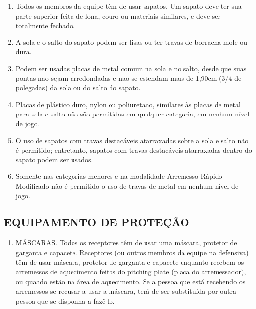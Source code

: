 \begin{multicols}{2}
	\begin{enumerate}[label=\alph*)]
		\item Todos os membros da equipe t\^em de usar sapatos. Um sapato deve ter sua parte 
		superior feita de lona, couro ou materiais similares, e deve ser totalmente fechado. 
		
		\item  A sola e o salto do sapato podem ser lisas ou ter travas de borracha mole ou dura. 
		
		\item  Podem ser usadas placas de metal comum na sola e no salto, desde que suas pontas 
		n\~ao sejam arredondadas e n\~ao se estendam mais de 1,90cm (3/4 de polegadas) da sola ou do salto do sapato. 
		
		\item  Placas de pl\'astico duro, nylon ou poliuretano, similares \`as placas de metal para sola 
		e salto n\~ao s\~ao permitidas em qualquer categoria, em nenhum n\'ivel de jogo. 
		
		\item  O uso de sapatos com travas destac\'aveis atarraxadas sobre a sola e salto n\~ao \'e 
		permitido; entretanto, sapatos com travas destac\'aveis atarraxadas dentro do sapato 
		podem ser usados. 
		
		\item  Somente nas categorias menores e na modalidade Arremesso R\'apido Modificado 
		n\~ao \'e permitido o uso de travas de metal em nenhum n\'ivel de jogo. 
	\end{enumerate}
	
	\subsection{EQUIPAMENTO DE PROTE\c{C}\~AO}\label{ssec:EquipProtecao} 
	
	\begin{enumerate}[label=\alph*)]
		\item \label{item:Mascara} M\'ASCARAS. Todos os receptores t\^em de usar uma m\'ascara, protetor de garganta e capacete. Receptores (ou outros membros da equipe na defensiva) t\^em de usar m\'ascara, protetor de garganta e capacete enquanto recebem os arremessos de aquecimento feitos do \gls{pitching plate} (placa do arremessador), ou quando est\~ao na \'area de aquecimento. Se a pessoa que est\'a recebendo os arremessos se recusar a usar a m\'ascara, ter\'a de ser substitu\'ida por outra pessoa que se disponha a faz\^e-lo. 
		

\end{enumerate}
\end{multicols}
